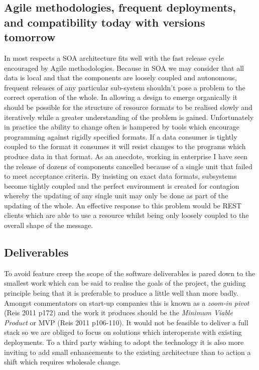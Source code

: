 \documentclass[12pt, ]{article}
\begin{document}
\subsection{Agile methodologies, frequent deployments, and compatibility
today with versions
tomorrow}\label{agile-methodologies-frequent-deployments-and-compatibility-today-with-versions-tomorrow}

In most respects a SOA architecture fits well with the fast release
cycle encouraged by Agile methodologies. Because in SOA we may consider
that all data is local and that the components are loosely coupled and
autonomous, frequent releases of any particular sub-system shouldn't
pose a problem to the correct operation of the whole. In allowing a
design to emerge organically it should be possible for the structure of
resource formats to be realised slowly and iteratively while a greater
understanding of the problem is gained. Unfortunately in practice the
ability to change often is hampered by tools which encourage programming
against rigidly specified formats. If a data consumer is tightly coupled
to the format it consumes it will resist changes to the programs which
produce data in that format. As an anecdote, working in enterprise I
have seen the release of dozens of components cancelled because of a
single unit that failed to meet acceptance criteria. By insisting on
exact data formats, subsystems become tightly coupled and the perfect
environment is created for contagion whereby the updating of any single
unit may only be done as part of the updating of the whole. An effective
response to this problem would be REST clients which are able to use a
resource whilst being only loosely coupled to the overall shape of the
message.

\subsection{Deliverables}\label{deliverables}

To avoid feature creep the scope of the software deliverables is pared
down to the smallest work which can be said to realise the goals of the
project, the guiding principle being that it is preferable to produce a
little well than more badly. Amongst commentators on start-up companies
this is known as a \emph{zoom-in pivot} (Reis 2011 p172) and the work it
produces should be the \emph{Minimum Viable Product} or MVP (Reis 2011
p106-110). It would not be feasible to deliver a full stack so we are
obliged to focus on solutions which interoperate with existing
deployments. To a third party wishing to adopt the technology it is also
more inviting to add small enhancements to the existing architecture
than to action a shift which requires wholesale change.
\end{document}
